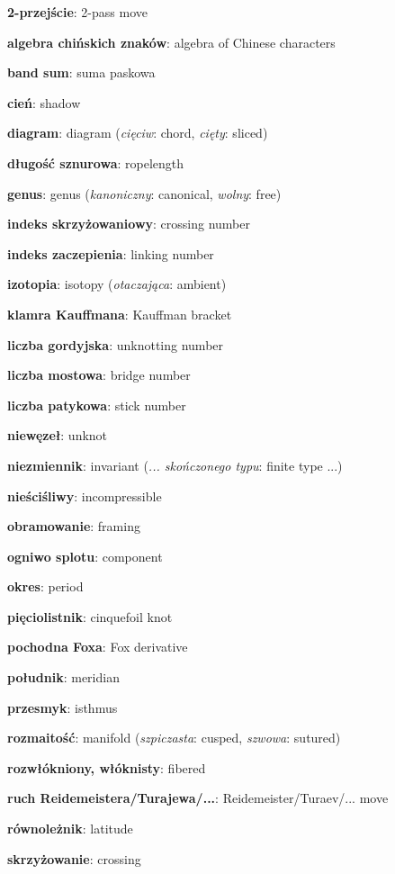 \item \textbf{2-przejście}: 2-pass move
\item \textbf{algebra chińskich znaków}: algebra of Chinese characters
\item \textbf{band sum}: suma paskowa
\item \textbf{cień}: shadow
\item \textbf{diagram}: diagram
(\emph{cięciw}: chord, \emph{cięty}: sliced)
\item \textbf{długość sznurowa}: ropelength
\item \textbf{genus}: genus
(\emph{kanoniczny}: canonical, \emph{wolny}: free)
\item \textbf{indeks skrzyżowaniowy}: crossing number
\item \textbf{indeks zaczepienia}: linking number
\item \textbf{izotopia}: isotopy
(\emph{otaczająca}: ambient)
\item \textbf{klamra Kauffmana}: Kauffman bracket
\item \textbf{liczba gordyjska}: unknotting number
\item \textbf{liczba mostowa}: bridge number
\item \textbf{liczba patykowa}: stick number
\item \textbf{niewęzeł}: unknot
\item \textbf{niezmiennik}: invariant
(\emph{... skończonego typu}: finite type ...)
\item \textbf{nieściśliwy}: incompressible
\item \textbf{obramowanie}: framing
\item \textbf{ogniwo splotu}: component
\item \textbf{okres}: period
\item \textbf{pięciolistnik}: cinquefoil knot
\item \textbf{pochodna Foxa}: Fox derivative
\item \textbf{południk}: meridian
\item \textbf{przesmyk}: isthmus
\item \textbf{rozmaitość}: manifold
(\emph{szpiczasta}: cusped, \emph{szwowa}: sutured)
\item \textbf{rozwłókniony, włóknisty}: fibered
\item \textbf{ruch Reidemeistera/Turajewa/...}: Reidemeister/Turaev/... move
\item \textbf{równoleżnik}: latitude
\item \textbf{skrzyżowanie}: crossing

